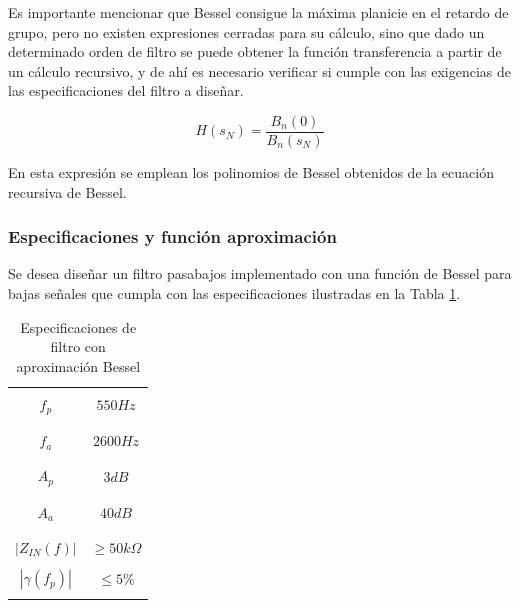 Es importante mencionar que Bessel consigue la m\'axima planicie en el retardo de grupo, pero no existen expresiones cerradas para su c\'alculo, sino que dado un determinado orden de filtro se puede obtener la funci\'on transferencia
a partir de un c\'alculo recursivo, y de ah\'i es necesario verificar si cumple con las exigencias de las especificaciones del filtro a dise\~nar.

\begin{equation}
    H(s_N) = \frac{B_n(0)}{B_n(s_N)}
\end{equation}

En esta expresi\'on se emplean los polinomios de Bessel obtenidos de la ecuaci\'on recursiva de Bessel.

\subsubsection{Especificaciones y funci\'on aproximaci\'on}
Se desea dise\~nar un filtro pasabajos implementado con una funci\'on de Bessel para bajas se\~nales que cumpla con las especificaciones ilustradas
en la Tabla \ref{table:especificaciones_bessel}.

\begin{table}[H]
    \centering
    \begin{tabular}{c | c}
        \hline \\
        $f_p$ & $550Hz$ \\
        \\ \hline \\
        $f_a$ & $2600Hz$ \\
        \\ \hline \\
        $A_p$ & $3 dB$ \\
        \\ \hline \\
        $A_a$ & $40 dB$ \\
        \\ \hline \\
        $|Z_{IN}(f)|$ & $\geq 50k \Omega$ \\ 
        \\ \hline
        $|\gamma(f_p)|$ & $\leq 5 \% $ \\ 
        \\ \hline
    \end{tabular}
    \caption{Especificaciones de filtro con aproximaci\'on Bessel}
    \label{table:especificaciones_bessel}
\end{table}

